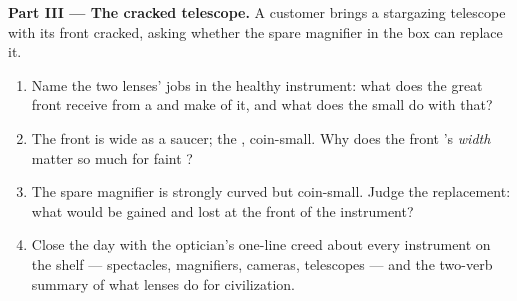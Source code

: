 \begin{problem}
\medskip\noindent\textbf{Part III --- The cracked
telescope.}
A customer brings a stargazing telescope with its front 
cracked, asking whether the spare magnifier in the box can
replace it.
\begin{enumerate}[resume]
  \item Name the two lenses' jobs in the healthy instrument:
        what does the great front  receive from a 
        and make of it, and what does the small  do
        with that?
  \item The front  is wide as a saucer; the ,
        coin-small. Why does the front 's \emph{width}
        matter so much for faint ?
  \item The spare magnifier is strongly curved but
        coin-small. Judge the replacement: what would be
        gained and lost at the front of the instrument?
  \item Close the day with the optician's one-line creed
        about every instrument on the shelf --- spectacles,
        magnifiers, cameras, telescopes --- and the two-verb
        summary of what lenses do for civilization.
\end{enumerate}
\end{problem}
